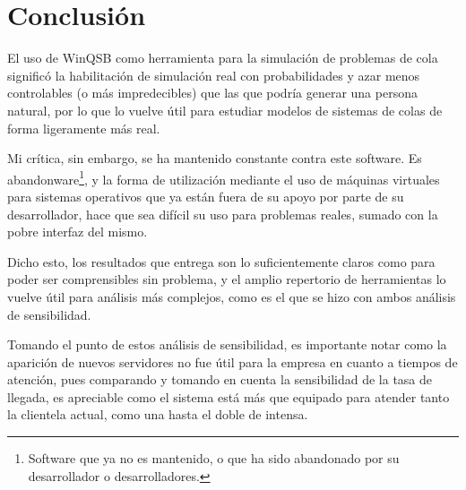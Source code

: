 \section{Conclusión}
El uso de WinQSB como herramienta para la simulación de problemas de cola significó la habilitación de simulación real con probabilidades y azar menos controlables (o más impredecibles) que las que podría generar una persona natural, por lo que lo vuelve útil para estudiar modelos de sistemas de colas de forma ligeramente más real.

Mi crítica, sin embargo, se ha mantenido constante contra este software. Es abandonware\footnote{Software que ya no es mantenido, o que ha sido abandonado por su desarrollador o desarrolladores.}, y la forma de utilización mediante el uso de máquinas virtuales para sistemas operativos que ya están fuera de su apoyo por parte de su desarrollador, hace que sea difícil su uso para problemas reales, sumado con la pobre interfaz del mismo.

Dicho esto, los resultados que entrega son lo suficientemente claros como para poder ser comprensibles sin problema, y el amplio repertorio de herramientas lo vuelve útil para análisis más complejos, como es el que se hizo con ambos análisis de sensibilidad.

Tomando el punto de estos análisis de sensibilidad, es importante notar como la aparición de nuevos servidores no fue útil para la empresa en cuanto a tiempos de atención, pues comparando y tomando en cuenta la sensibilidad de la tasa de llegada, es apreciable como el sistema está más que equipado para atender tanto la clientela actual, como una hasta el doble de intensa.

